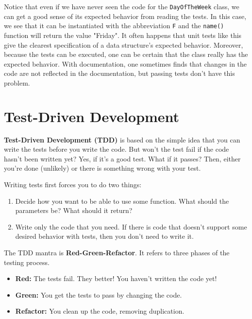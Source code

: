 Notice that even if we have never seen the code for the \texttt{DayOfTheWeek} class, we can get a good sense of its expected behavior from reading the tests.  In this case, we see that it can be instantiated with the abbreviation \texttt{F} and the \texttt{name()} function will return the value "Friday".  It often happens that unit tests like this give the clearest specification of a data structure’s expected behavior.  Moreover, because the tests can be executed, one can be certain that the class really has the expected behavior.  With documentation, one sometimes finds that changes in the code are not reflected in the documentation, but passing tests don’t have this problem.

\section{Test-Driven Development}


\textbf{Test-Driven Development (TDD)} is based on the simple idea that you can write the tests before you write the code.  But won’t the test fail if the code hasn’t been written yet?  Yes, if it’s a good test.  What if it passes?  Then, either you’re done (unlikely) or there is something wrong with your test.


Writing tests first forces you to do two things:

\begin{enumerate}

\item Decide how you want to be able to use some function.  What should the parameters be?  What should it return?

\item Write only the code that you need.  If there is code that doesn’t support some desired behavior with tests, then you don’t need to write it.

\end{enumerate}

The TDD mantra is \textbf{Red-Green-Refactor}.  It refers to three phases of the testing process.

\begin{itemize}

\item \textbf{Red:} The tests fail.  They better!  You haven’t written the code yet!

\item \textbf{Green:} You get the tests to pass by changing the code.

\item \textbf{Refactor:} You clean up the code, removing duplication.

\end{itemize}


